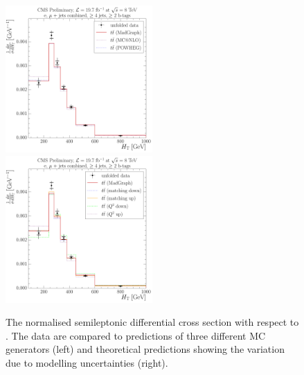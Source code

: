 \begin{figure}[!htbp]
	\centering
  	{\includegraphics[width=0.5\textwidth]{measurement/HT/central/normalised_xsection_combined_different_generators}}\hfill
  	{\includegraphics[width=0.5\textwidth]{measurement/HT/central/normalised_xsection_combined_systematics_shifts}}
    \caption[The normalised semileptonic \ttbar differential cross section with respect to \HT.]{The normalised
      semileptonic \ttbar differential cross section with respect to \HT. The data are compared to predictions of three
      different MC generators (left) and theoretical predictions showing the variation due to modelling uncertainties
      (right).}
    \label{fig:results_HT_combined}
\end{figure}

